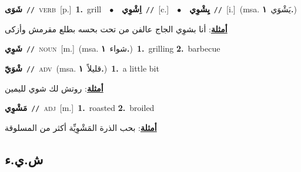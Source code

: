 \documentclass[10pt,a4paper,twoside]{article} %
\begin{document}
\begin{multicols}{2}
{\setlength\topsep{0pt}\textbf{\foreignlanguage{arabic}{شَوَى}}\ {\color{gray}\texttt{//}\color{black}}\ \textsc{verb}\ [p.]\ \textbf{1.}~grill\ \ $\bullet$\ \ \setlength\topsep{0pt}\textbf{\foreignlanguage{arabic}{اِشْوِي}}\ {\color{gray}\texttt{//}\color{black}}\ [c.]\ \ $\bullet$\ \ \setlength\topsep{0pt}\textbf{\foreignlanguage{arabic}{يِشْوِي}}\ {\color{gray}\texttt{//}\color{black}}\ [i.]\ \color{gray}(msa. \foreignlanguage{arabic}{يَشْوَي}~\foreignlanguage{arabic}{\textbf{١.}})\color{black}\  \begin{flushright}\color{gray}\foreignlanguage{arabic}{\textbf{\underline{\foreignlanguage{arabic}{أمثلة}}}: أنا بشوِي الجاج عالفن من تحت بحسه بطلع مقرمش وأزكى}\end{flushright}\color{black}} \vspace{2mm}

{\setlength\topsep{0pt}\textbf{\foreignlanguage{arabic}{شَوِي}}\ {\color{gray}\texttt{//}\color{black}}\ \textsc{noun}\ [m.]\ \color{gray}(msa. \foreignlanguage{arabic}{شواء}~\foreignlanguage{arabic}{\textbf{١.}})\color{black}\ \textbf{1.}~grilling  \textbf{2.}~barbecue\ } \vspace{2mm}

{\setlength\topsep{0pt}\textbf{\foreignlanguage{arabic}{شْوَيّ}}\ {\color{gray}\texttt{//}\color{black}}\ \textsc{adv}\ \color{gray}(msa. \foreignlanguage{arabic}{قليلاً}~\foreignlanguage{arabic}{\textbf{١.}})\color{black}\ \textbf{1.}~a little bit\  \begin{flushright}\color{gray}\foreignlanguage{arabic}{\textbf{\underline{\foreignlanguage{arabic}{أمثلة}}}: روتش لك شوي لليمين}\end{flushright}\color{black}} \vspace{2mm}

{\setlength\topsep{0pt}\textbf{\foreignlanguage{arabic}{مَشْوِي}}\ {\color{gray}\texttt{//}\color{black}}\ \textsc{adj}\ [m.]\ \textbf{1.}~roasted  \textbf{2.}~broiled\  \begin{flushright}\color{gray}\foreignlanguage{arabic}{\textbf{\underline{\foreignlanguage{arabic}{أمثلة}}}: بحب الذرة المَشْوِيِّة أكثر من المسلوقة}\end{flushright}\color{black}} \vspace{2mm}

\vspace{-3mm}
\subsection*{\color{blue}\foreignlanguage{arabic}{ش.ي.ء}\color{blue}{}} 


\end{multicols}
\end{document}
